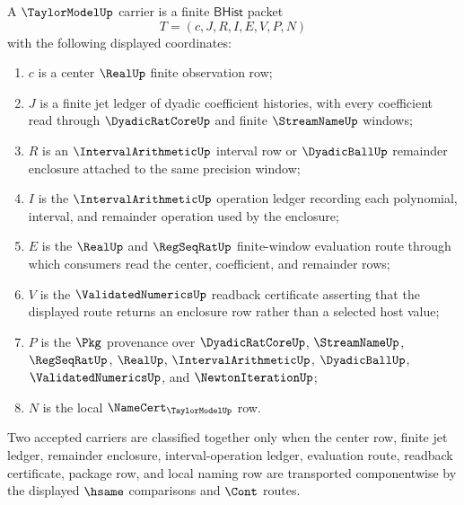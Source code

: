 \begin{definition}
\label{def:taylormodel-bhist-carrier}
A $\TaylorModelUp$ carrier is a finite $\mathsf{BHist}$ packet
$$
T=(c,J,R,I,E,V,P,N)
$$
with the following displayed coordinates:
\begin{enumerate}
\item $c$ is a center $\RealUp$ finite observation row;
\item $J$ is a finite jet ledger of dyadic coefficient histories, with every coefficient read through $\DyadicRatCoreUp$ and finite $\StreamNameUp$ windows;
\item $R$ is an $\IntervalArithmeticUp$ interval row or $\DyadicBallUp$ remainder enclosure attached to the same precision window;
\item $I$ is the $\IntervalArithmeticUp$ operation ledger recording each polynomial, interval, and remainder operation used by the enclosure;
\item $E$ is the $\RealUp$ and $\RegSeqRatUp$ finite-window evaluation route through which consumers read the center, coefficient, and remainder rows;
\item $V$ is the $\ValidatedNumericsUp$ readback certificate asserting that the displayed route returns an enclosure row rather than a selected host value;
\item $P$ is the $\Pkg$ provenance over $\DyadicRatCoreUp$, $\StreamNameUp$, $\RegSeqRatUp$, $\RealUp$, $\IntervalArithmeticUp$, $\DyadicBallUp$, $\ValidatedNumericsUp$, and $\NewtonIterationUp$;
\item $N$ is the local $\NameCert_{\TaylorModelUp}$ row.
\end{enumerate}
Two accepted carriers are classified together only when the center row, finite jet ledger, remainder enclosure, interval-operation ledger, evaluation route, readback certificate, package row, and local naming row are transported componentwise by the displayed $\hsame$ comparisons and $\Cont$ routes.
\end{definition}

